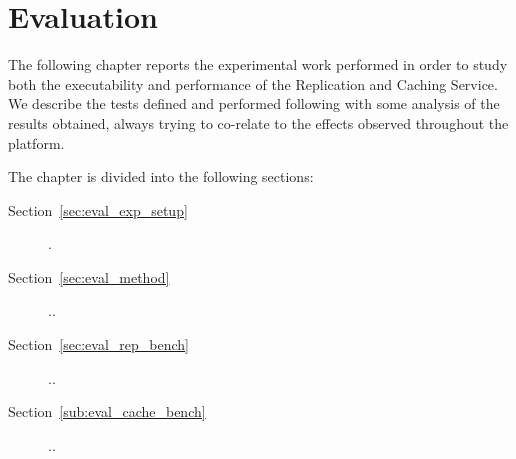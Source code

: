 \chapter{Evaluation}
\label{cha:evaluation}


The following chapter reports the experimental work performed in order to study both the executability and performance of the Replication and Caching Service. We describe the tests defined and performed following with some analysis of the results obtained, always trying to co-relate to the effects observed throughout the platform.

The chapter is divided into the following sections:

\begin{description}
    \item [Section~\ref{sec:eval_exp_setup}] .
    \item [Section~\ref{sec:eval_method}] ..
    \item [Section~\ref{sec:eval_rep_bench}] ..
    \item [Section~\ref{sub:eval_cache_bench}] ..
\end{description}







